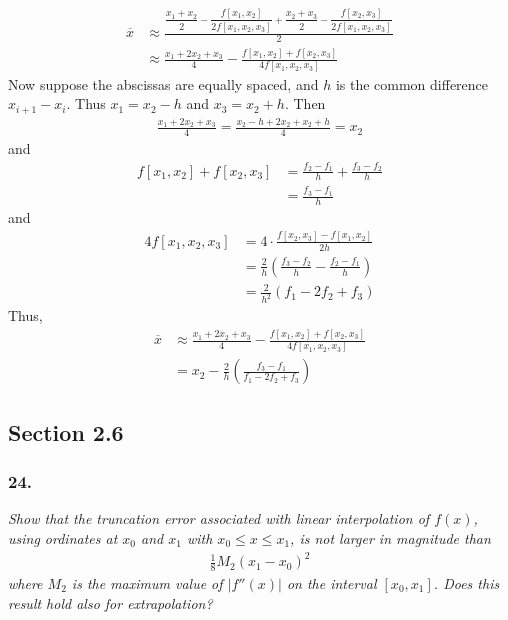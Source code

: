 \documentclass[12pt]{article}
\begin{document}
\begin{align*}
\overline{x} &\approx \frac{\dfrac{x_1 + x_2}{2} - \dfrac{f[x_1, x_2]}{2f[x_1, x_2, x_3]} + \dfrac{x_2 + x_3}{2} - \dfrac{f[x_2, x_3]}{2f[x_1, x_2, x_3]}}{2} \\[.2cm]
&\approx \boxed{\frac{x_1 + 2x_2 + x_3}{4} - \frac{f[x_1, x_2] + f[x_2, x_3]}{4f[x_1, x_2, x_3]}}
\end{align*}
Now suppose the abscissas are equally spaced, and $h$ is the common difference $x_{i+1} - x_i$.  Thus $x_1 = x_2 - h$ and $x_3 = x_2 + h$.  Then
\begin{align*}
\frac{x_1 + 2x_2 + x_3}{4} = \frac{x_2 - h + 2x_2 + x_2 + h}{4} = x_2
\end{align*}
and
\begin{align*}
f[x_1, x_2] + f[x_2, x_3] &= \frac{f_2 - f_1}{h} + \frac{f_3 - f_2}{h}\\
&= \frac{f_3 - f_1}{h}
\end{align*}
and
\begin{align*}
4f[x_1, x_2, x_3] &= 4\cdot \frac{f[x_2, x_3] - f[x_1, x_2]}{2h} \\[.2cm]
&= \frac{2}{h}\left(\frac{f_3 - f_2}{h} - \frac{f_2 - f_1}{h}\right) \\[.2cm]
&= \frac{2}{h^2}\left(f_1 - 2f_2 + f_3\right)
\end{align*}
Thus,
\begin{align*}
\overline{x} &\approx \frac{x_1 + 2x_2 + x_3}{4} - \frac{f[x_1, x_2] + f[x_2, x_3]}{4f[x_1, x_2, x_3]} \\
&= \boxed{x_2 - \frac{2}{h}\left(\frac{f_3 - f_1}{f_1 - 2f_2 + f_3}\right)}
\end{align*}

\subsection*{Section 2.6}

\subsubsection*{24.}

{\it Show that the truncation error associated with linear interpolation of $f(x)$, using ordinates at $x_0$ and $x_1$ with $x_0 \leq x \leq x_1$, is not larger in magnitude than}
\begin{align*}
\frac{1}{8}M_2(x_1 - x_0)^2
\end{align*}
{\it where $M_2$ is the maximum value of $|f''(x)|$ on the interval $[x_0, x_1]$.  Does this result hold also for extrapolation?} \\
\end{document}
